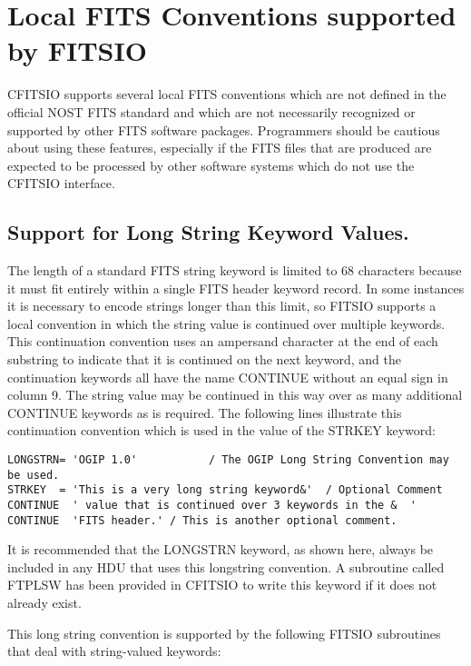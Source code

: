 \documentclass[11pt]{book}
\begin{document}
\section{Local FITS Conventions supported by FITSIO}

CFITSIO supports several local FITS conventions which are not
defined in the official NOST FITS standard and which are not
necessarily recognized or supported by other FITS software packages.
Programmers should be cautious about using these features, especially
if the FITS files that are produced are expected to be processed by
other software systems which do not use the CFITSIO interface.


\subsection{Support for Long String Keyword Values.}

The length of a standard FITS string keyword is limited to 68
characters because it must fit entirely within a single FITS header
keyword record.  In some instances it is necessary to encode strings
longer than this limit, so FITSIO supports a local convention in which
the string value is continued over multiple keywords. This
continuation convention uses an ampersand character at the end of each
substring to indicate that it is continued on the next keyword, and the
continuation keywords all have the name CONTINUE without an equal sign
in column 9. The string value may be continued in this way over as many
additional CONTINUE keywords as is required.  The following lines
illustrate this continuation convention which is used in the value of
the STRKEY keyword:

\begin{verbatim}
LONGSTRN= 'OGIP 1.0'           / The OGIP Long String Convention may be used.
STRKEY  = 'This is a very long string keyword&'  / Optional Comment
CONTINUE  ' value that is continued over 3 keywords in the &  '
CONTINUE  'FITS header.' / This is another optional comment.
\end{verbatim}
It is recommended that the LONGSTRN keyword, as shown
here, always be included in any HDU that uses this longstring
convention.  A subroutine called FTPLSW
has been provided in CFITSIO to write this keyword if it does not
already exist.

This long string convention is supported by the following FITSIO
subroutines that deal with string-valued keywords:
\end{document}
